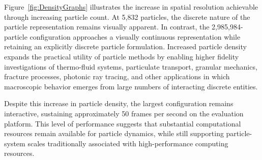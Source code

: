 

Figure~\ref{fig:DensityGraphs} illustrates the increase in spatial
resolution achievable through increasing particle count. At 5,832
particles, the discrete nature of the particle representation remains
visually apparent. In contrast, the 2,985,984-particle configuration
approaches a visually continuous representation while retaining an
explicitly discrete particle formulation. Increased particle density
expands the practical utility of particle methods by enabling higher
fidelity investigations of thermo-fluid systems, particulate transport,
granular mechanics, fracture processes, photonic ray tracing, and other
applications in which macroscopic behavior emerges from large numbers
of interacting discrete entities.

Despite this increase in particle density, the largest configuration
remains interactive, sustaining approximately 50 frames per second on
the evaluation platform. This level of performance suggests that
substantial computational resources remain available for particle
dynamics, while still supporting particle-system scales traditionally
associated with high-performance computing resources.




